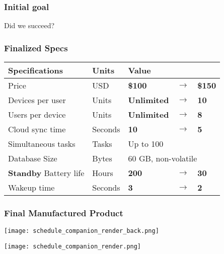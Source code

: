 \documentclass{beamer}
\begin{document}
\begin{frame}
  \frametitle{Initial goal}

  

  \begin{center}
    Did we succeed?
  \end{center}

\end{frame}

\begin{frame}
  \frametitle{Finalized Specs}
  \centering
    \begin{tabular}{lllll}
    \hline
    Specifications                & Units   & \multicolumn{3}{l}{Value}                        \\
    \hline
    Price                         & USD     & \textbf{\$100}     & \textbf{$\rightarrow$} & \textbf{\$150} \\
    Devices per user              & Units   & \textbf{Unlimited} & \textbf{$\rightarrow$} & \textbf{10}    \\
    Users per device              & Units   & \textbf{Unlimited} & \textbf{$\rightarrow$} & \textbf{8}     \\
    Cloud sync time               & Seconds & \textbf{10}        & \textbf{$\rightarrow$} & \textbf{5}     \\
    Simultaneous tasks             & Tasks   & \multicolumn{3}{l}{Up to 100}                    \\
    Database Size                 & Bytes   & \multicolumn{3}{l}{60 GB, non-volatile}          \\
    \textbf{Standby} Battery life & Hours   & \textbf{200}       & \textbf{$\rightarrow$} & \textbf{30}    \\
    Wakeup time                   & Seconds & \textbf{3}         & \textbf{$\rightarrow$} & \textbf{2}    \\
    \hline
    \end{tabular}
\end{frame}

\begin{frame}
  \frametitle{Final Manufactured Product}

  \begin{minipage}{0.33\textwidth}
    \texttt{[image: schedule\_companion\_render\_back.png]}
  \end{minipage}
  \hfill
  \begin{minipage}{0.65\textwidth}
    \texttt{[image: schedule\_companion\_render.png]}
  \end{minipage}%
  

\end{frame}
\end{document}
